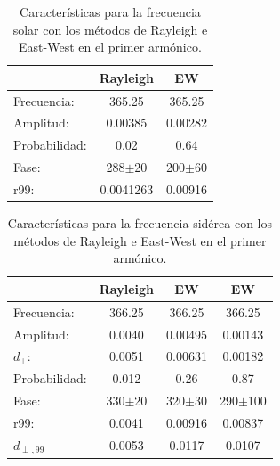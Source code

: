     \begin{table}[H]
        \begin{small}
            \begin{center}
                \begin{tabular}[c]{l|c|c}
                                    & Rayleigh      & EW            \\\hline
                    Frecuencia:     & 365.25	    & 365.25        \\
                    Amplitud:       & 0.00385       & 0.00282       \\
                    Probabilidad:   & 0.02          & 0.64          \\
                    Fase:           & 288$\pm$20    & 200$\pm$60    \\
                    r99:            & 0.0041263     & 0.00916       \\
                \end{tabular}
            \end{center}
        \end{small}
        \caption{Características para la frecuencia solar con los métodos de Rayleigh  e East-West en el primer armónico.}
        \label{tab:solar_3}
    \end{table}

    \begin{table}[H]
        \begin{small}
            \begin{center}
                \begin{tabular}[c]{l|c||c|c}
                                    & Rayleigh     & EW         & EW\cite{Aab_2020}      \\\hline
                    Frecuencia:     & 366.25	   & 366.25     & 366.25      \\
                    Amplitud:       & 0.0040	   & 0.00495    & 0.00143      \\
                    $d_\perp$:      & 0.0051       & 0.00631    & 0.00182      \\ 
                    Probabilidad:   & 0.012	       & 0.26       & 0.87          \\
                    Fase:           & 330$\pm$20   & 320$\pm$30 & 290$\pm$100      \\
                    r99:            & 0.0041	   & 0.00916    & 0.00837      \\
                    $d_{\perp,99}$  & 0.0053       & 0.0117     & 0.0107       \\
                \end{tabular}
            \end{center}
        \end{small}
        \caption{Características para la frecuencia sidérea con los métodos de Rayleigh  e East-West en el primer armónico.}
        \label{tab:siderea_3}
    \end{table}

